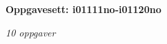 \centerline{\bf Oppgavesett: i01111no-i01120no}
\vskip 10pt
\centerline{\it 10 oppgaver}\vskip 10pt
\vskip 10pt
